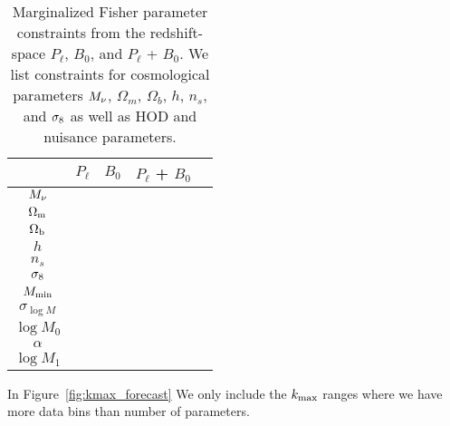 \begin{table}
    \caption{Marginalized Fisher parameter constraints from the redshift-space 
    $P_\ell$, $B_0$, and $P_\ell$ + $B_0$. We list constraints for cosmological 
    parameters $M_\nu$, $\Omega_m$, $\Omega_b$, $h$, $n_s$, and $\sigma_8$ as well 
    as HOD and nuisance parameters.} 
\begin{center} 
    \begin{tabular}{ccccc} \toprule
            & $P_\ell$ & $B_0$ & $P_\ell$ + $B_0$ \\[3pt]
\hline 
$M_\nu$     & & & \\
$\Omega_{\rm m}$       & & & \\
$\Omega_{\rm b}$       & & & \\
$h$         & & & \\
$n_s$       & & & \\
$\sigma_8$      & & & \\\hline
$M_{\rm min}$       & & & \\
$\sigma_{\log M}$   & & & \\ 
$\log M_0$          & & & \\
$\alpha$            & & & \\ 
$\log M_1$          & & & \\ [3pt]
\hline            
\end{tabular} \label{tab:forecast}
\end{center}
\end{table}

In Figure~\ref{fig:kmax_forecast} We only include the $k_{\rm max}$ ranges where we have more data bins than
number of parameters. 

